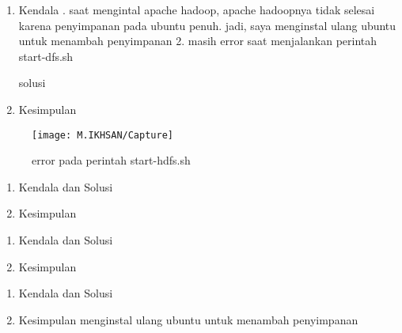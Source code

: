 
\begin{enumerate}
\item Kendala
. saat mengintal apache hadoop, apache hadoopnya tidak selesai karena penyimpanan pada ubuntu penuh. jadi, saya menginstal ulang ubuntu untuk menambah penyimpanan
2. masih error saat menjalankan perintah start-dfs.sh 

solusi
\item Kesimpulan

\end{enumerate}

\begin{figure}[!ht]
    \texttt{[image: M.IKHSAN/Capture]}
    \caption{error pada perintah start-hdfs.sh}
    \label{gam:Hasil}
\end{figure}

\begin{enumerate}
\item Kendala dan Solusi

\item Kesimpulan

\end{enumerate}

\begin{enumerate}
\item Kendala dan Solusi

\item Kesimpulan

\end{enumerate}


\begin{enumerate}
\item Kendala dan Solusi


\item Kesimpulan
\newline menginstal ulang ubuntu untuk menambah penyimpanan
\end{enumerate}

